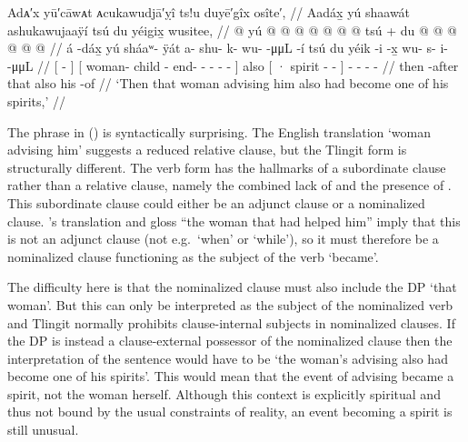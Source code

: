 \ex\label{ex:100-157-woman-who-advised}%
%
\begingl
	\glpreamble	Adᴀ′x yū′cāwᴀt ᴀcukawudjā′ỵî ts!u duyē′gîx osîte′, //
	\glpreamble	Aadáx̱ yú shaawát ashukawujaaÿí tsú du yéigix̱ wusitee, //
	\gla	{}  @ {} {} 
		{} yú 
			 @ {}
			 @ {} @ {} @ {} @ {} @ {} @ {} {}
		tsú +
		{} du  @ {} @ {} {}
		 @ {} @ {} @ {} @ {} //
	\glb	{} á -dáx̱ {} 
		{} yú 
			sháaʷ- ÿát
			a- shu- k- wu-  -μμL -í {}
		tsú 
		{} du yéik -i -x̱ {}
		wu- s- i-  -μμL //
	\glc	{}[  - {}]
		{}[  woman- child
			- end- - -  - - {}]
		also
		{}[ · spirit - - {}]
		- - -  - //
	\gld	{} then -after {} 
		{} that  {}
			 {} {} {} {} {} {} {}
		also
		{} his  {} -of {}
		 {} {} {} {} //
	\glft	‘Then that woman advising him also had become one of his spirits,’
		//
\endgl
\xe

The phrase  in (\lastx) is syntactically surprising.
The English translation ‘woman advising him’ suggests a reduced relative clause, but the Tlingit form is structurally different.
The verb form  has the hallmarks of a subordinate clause rather than a relative clause, namely the combined lack of  and the presence of .
This subordinate clause could either be an adjunct clause or a nominalized clause.
\citeauthor{swanton:1909}’s translation and gloss “the woman that had helped him” imply that this is not an adjunct clause (not e.g.\ ‘when’ or ‘while’), so it must therefore be a nominalized clause functioning as the subject of the verb  ‘became’.

The difficulty here is that the nominalized clause must also include the DP  ‘that woman’.
But this can only be interpreted as the subject of the nominalized verb and Tlingit normally prohibits clause-internal subjects in nominalized clauses.
If the DP  is instead a clause-external possessor of the nominalized clause then the interpretation of the sentence would have to be ‘the woman’s advising also had become one of his spirits’.
This would mean that the event of advising became a spirit, not the woman herself.
Although this context is explicitly spiritual and thus not bound by the usual constraints of reality, an event becoming a spirit is still unusual.

